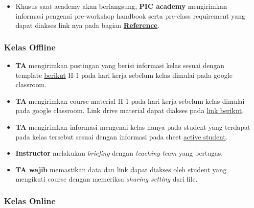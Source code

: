 \documentclass[
]{book}
\providecommand{\tightlist}{%
  \setlength{\itemsep}{0pt}\setlength{\parskip}{0pt}}
\begin{document}
\begin{itemize}
\tightlist
\item
  Khusus saat academy akan berlangsung, \textbf{PIC academy} mengirimkan informasi pengenai pre-workshop handbook serta pre-class requirement yang dapat diakses link nya pada bagian \href{http://127.0.0.1:46600/rmd_output/0/references.html}{\textbf{Reference}}.
\end{itemize}

\hypertarget{kelas-offline}{%
\subsubsection{Kelas Offline}\label{kelas-offline}}

\begin{itemize}
\tightlist
\item
  \textbf{TA} mengirimkan postingan yang berisi informasi kelas sesuai dengan template \href{https://docs.google.com/document/d/1leWbp3Eb2AwumFieuHiWStSNOXsKJQJD_h0tAhA2fLs/edit?usp=sharing}{berikut} H-1 pada hari kerja sebelum kelas dimulai pada google classroom.
\item
  \textbf{TA} mengirimkan course material H-1 pada hari kerja sebelum kelas dimulai pada google classroom. Link drive material dapat diakses pada \href{https://drive.google.com/drive/folders/1I1h0p4BkvkUYV8mtDU7bgswE_awOIxWY?usp=sharing}{link berikut}.
\item
  \textbf{TA} mengirimkan informasi mengenai kelas hanya pada student yang terdapat pada kelas tersebut sesuai dengan informasi pada sheet \href{https://docs.google.com/spreadsheets/d/12FB9410fhRhZp9jl5qLe7x-LGw0QTSfLujA-dE867JE/edit?usp=sharing}{active student}.
\item
  \textbf{Instructor} melakukan \emph{briefing} dengan \emph{teaching team} yang bertugas.
\item
  \textbf{TA wajib} memastikan data dan link dapat diakses oleh student yang mengikuti course dengan memeriksa \emph{sharing setting} dari file.
\end{itemize}

\hypertarget{kelas-online}{%
\subsubsection{Kelas Online}\label{kelas-online}}
\end{document}
